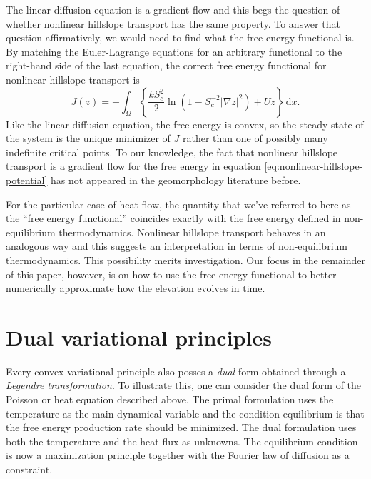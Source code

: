 \documentclass{article}
\theoremstyle{definition}
\theoremstyle{plain}
\newcommand{\ud}{\hspace{2pt}\mathrm{d}}
\begin{document}
The linear diffusion equation is a gradient flow and this begs the question of whether nonlinear hillslope transport has the same property.
To answer that question affirmatively, we would need to find what the free energy functional is.
By matching the Euler-Lagrange equations for an arbitrary functional to the right-hand side of the last equation, the correct free energy functional for nonlinear hillslope transport is
\begin{equation}
    J(z) = -\int_\Omega\left\{\frac{k S_c^2}{2}\ln\left(1 - S_c^{-2}|\nabla z|^2\right) + U z\right\}\ud x.
    \label{eq:nonlinear-hillslope-potential}
\end{equation}
Like the linear diffusion equation, the free energy is convex, so the steady state of the system is the unique minimizer of $J$ rather than one of possibly many indefinite critical points.
To our knowledge, the fact that nonlinear hillslope transport is a gradient flow for the free energy in equation \eqref{eq:nonlinear-hillslope-potential} has not appeared in the geomorphology literature before.

For the particular case of heat flow, the quantity that we've referred to here as the ``free energy functional'' coincides exactly with the free energy defined in non-equilibrium thermodynamics.
Nonlinear hillslope transport behaves in an analogous way and this suggests an interpretation in terms of non-equilibrium thermodynamics.
This possibility merits investigation.
Our focus in the remainder of this paper, however, is on how to use the free energy functional to better numerically approximate how the elevation evolves in time.


\section{Dual variational principles}

Every convex variational principle also posses a \emph{dual} form obtained through a \emph{Legendre transformation}.
To illustrate this, one can consider the dual form of the Poisson or heat equation described above.
The primal formulation uses the temperature as the main dynamical variable and the condition equilibrium is that the free energy production rate should be minimized.
The dual formulation uses both the temperature and the heat flux as unknowns.
The equilibrium condition is now a maximization principle together with the Fourier law of diffusion as a constraint.
\end{document}
